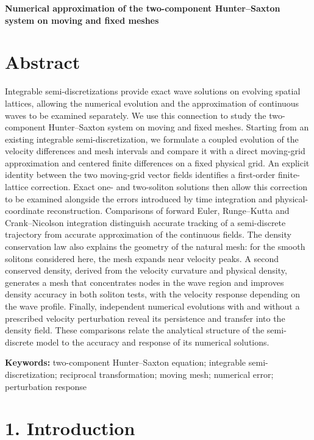 \documentclass[11pt,a4paper]{article}
\begin{document}
{\centering\LARGE\bfseries Numerical approximation of the two-component Hunter–Saxton system on moving and fixed meshes\par}
\vspace{1.2em}
 
\FloatBarrier
\section*{Abstract}

Integrable semi-discretizations provide exact wave solutions on evolving spatial lattices, allowing the numerical evolution and the approximation of continuous waves to be examined separately. We use this connection to study the two-component Hunter–Saxton system on moving and fixed meshes. Starting from an existing integrable semi-discretization, we formulate a coupled evolution of the velocity differences and mesh intervals and compare it with a direct moving-grid approximation and centered finite differences on a fixed physical grid. An explicit identity between the two moving-grid vector fields identifies a first-order finite-lattice correction. Exact one- and two-soliton solutions then allow this correction to be examined alongside the errors introduced by time integration and physical-coordinate reconstruction. Comparisons of forward Euler, Runge–Kutta and Crank–Nicolson integration distinguish accurate tracking of a semi-discrete trajectory from accurate approximation of the continuous fields. The density conservation law also explains the geometry of the natural mesh: for the smooth solitons considered here, the mesh expands near velocity peaks. A second conserved density, derived from the velocity curvature and physical density, generates a mesh that concentrates nodes in the wave region and improves density accuracy in both soliton tests, with the velocity response depending on the wave profile. Finally, independent numerical evolutions with and without a prescribed velocity perturbation reveal its persistence and transfer into the density field. These comparisons relate the analytical structure of the semi-discrete model to the accuracy and response of its numerical solutions.

\textbf{Keywords:} two-component Hunter–Saxton equation; integrable semi-discretization; reciprocal transformation; moving mesh; numerical error; perturbation response

\FloatBarrier
\section*{1. Introduction}
\end{document}
